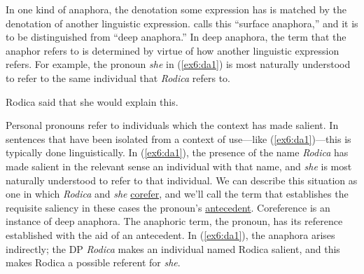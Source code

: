 In one kind of anaphora, the denotation some expression has is matched by the denotation of another linguistic expression. \citet{Hankamer:1976} calls this ``surface anaphora,'' and it is to be distinguished from ``deep anaphora.'' In deep anaphora, the term that the anaphor refers to is determined by virtue of how another linguistic expression refers. For example, the pronoun \emph{she} in (\ref{ex6:da1}) is most naturally understood to refer to the same individual that \emph{Rodica} refers to.
\begin{exe}
	\raggedright
	\ex \label{ex6:da1}
	Rodica said that she would explain this.
\end{exe}
Personal pronouns refer to individuals which the context has made salient. In sentences that have been isolated from a context of use---like (\ref{ex6:da1})---this is typically done linguistically. In (\ref{ex6:da1}), the presence of the name \emph{Rodica} has made salient in the relevant sense an individual with that name, and \emph{she} is most naturally understood to refer to that individual. We can describe this situation as one in which \emph{Rodica} and \emph{she} \underline{corefer}, and we'll call the term that establishes the requisite saliency in these cases the pronoun's \underline{antecedent}. Coreference is an instance of deep anaphora. The anaphoric term, the pronoun, has its reference established with the aid of an antecedent. In (\ref{ex6:da1}), the anaphora arises indirectly; the DP \emph{Rodica} makes an individual named Rodica salient, and this makes Rodica a possible referent for \emph{she}.


